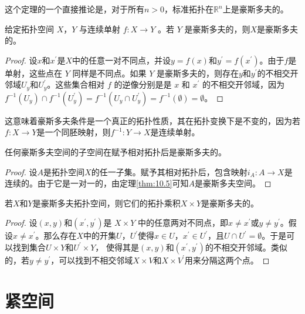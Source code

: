 这个定理的一个直接推论是，对于所有$n >0$，标准拓扑在$\mathbb{R}^{n}$上是豪斯多夫的。

\begin{theorem}\label{eg:10.5}
	给定拓扑空间 $X$，$Y$ 与连续单射 $f:X\rightarrow Y$ 。若 $Y$ 是豪斯多夫的，则$X$是豪斯多夫的。
\end{theorem}

\begin{proof}
	设$x$和$x^{\prime}$是$X$中的任意一对不同点，并设$y=f(x)$和$y^{\prime}=f(x^{\prime})$。由于$f$是单射，这些点在 $Y$ 同样是不同点。如果 $Y$ 是豪斯多夫的，则存在$y$和$y^{\prime}$的不相交开邻域$U_{y}$和$U_{y} ^{\prime}$。这些集合相对 $f$ 的逆像分别是是 $x$ 和 $x^{\prime}$ 的不相交开邻域，因为$f^{-1} (U_{y} )\cap f^{-1} (U_{y} ^{\prime})=f^{-1} (U_{y} \cap U_{y} ^{\prime})=f^{-1} (\emptyset )=\emptyset $。
\end{proof}

	这意味着豪斯多夫条件是一个真正的拓扑性质，其在拓扑变换下是不变的，因为若$f:X\rightarrow Y$是一个同胚映射，则$f^{-1} :Y\rightarrow X$是连续单射。

\begin{corollary}\label{eg:10.6}
	任何豪斯多夫空间的子空间在赋予相对拓扑后是豪斯多夫的。
\end{corollary}

\begin{proof}
	设$A$是拓扑空间$X$的任一子集。赋予其相对拓扑后，包含映射$i_{A} :A\rightarrow X$是连续的。由于它是一对一的，由定理\ref{thm:10.5}可知$A$是豪斯多夫空间。
\end{proof}

\begin{theorem}\label{eg:10.7}
	若$X$和$Y$是豪斯多夫拓扑空间，则它们的拓扑乘积$X\times Y$是豪斯多夫的。
\end{theorem}

\begin{proof}
	设$(x,y)$和$(x^{\prime},y^{\prime})$是 $X\times Y$ 中的任意两对不同点，即$x\neq x^{\prime}$或$y\neq y^{\prime}$。假设$x\neq x^{\prime}$。那么存在$X$中的开集$U$，$U^{\prime}$使得$x\in U$，$x^{\prime}\in U^{\prime}$，且$U\cap U^{\prime}=\emptyset $。于是可以找到集合$U\times Y$和$U^{\prime}\times Y$， 使得其是$(x,y)$和$(x^{\prime},y^{\prime})$的不相交开邻域。类似的，若$y\neq y^{\prime}$，可以找到不相交邻域$X\times V$和$X\times V^{\prime}$用来分隔这两个点。
\end{proof}

\section{紧空间}


